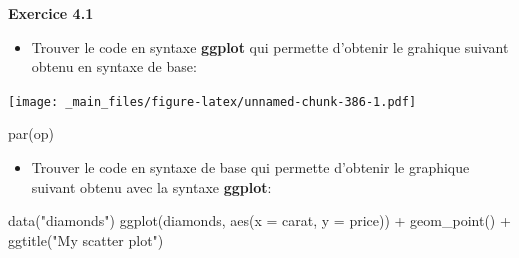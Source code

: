 \documentclass[
]{book}
\newenvironment{Shaded}{\begin{snugshade}}{\end{snugshade}}
\newcommand{\AttributeTok}[1]{\textcolor[rgb]{0.77,0.63,0.00}{#1}}
\newcommand{\DecValTok}[1]{\textcolor[rgb]{0.00,0.00,0.81}{#1}}
\newcommand{\FloatTok}[1]{\textcolor[rgb]{0.00,0.00,0.81}{#1}}
\newcommand{\FunctionTok}[1]{\textcolor[rgb]{0.00,0.00,0.00}{#1}}
\newcommand{\NormalTok}[1]{#1}
\newcommand{\OtherTok}[1]{\textcolor[rgb]{0.56,0.35,0.01}{#1}}
\newcommand{\SpecialCharTok}[1]{\textcolor[rgb]{0.00,0.00,0.00}{#1}}
\newcommand{\StringTok}[1]{\textcolor[rgb]{0.31,0.60,0.02}{#1}}
\providecommand{\tightlist}{%
  \setlength{\itemsep}{0pt}\setlength{\parskip}{0pt}}
\theoremstyle{definition}
\theoremstyle{definition}
\theoremstyle{definition}
\theoremstyle{definition}
\theoremstyle{remark}
\begin{document}
\textbf{Exercice 4.1}

\begin{itemize}
\tightlist
\item
  Trouver le code en syntaxe \textbf{ggplot} qui permette d'obtenir le grahique suivant obtenu en syntaxe de base:
\end{itemize}

\begin{Shaded}
\end{Shaded}

\texttt{[image: \_main\_files/figure-latex/unnamed-chunk-386-1.pdf]}

\begin{Shaded}
\begin{Highlighting}[]
\FunctionTok{par}\NormalTok{(op)}
\end{Highlighting}
\end{Shaded}

\begin{itemize}
\tightlist
\item
  Trouver le code en syntaxe de base qui permette d'obtenir le graphique suivant obtenu avec la syntaxe \textbf{ggplot}:
\end{itemize}

\begin{Shaded}
\begin{Highlighting}[]
\FunctionTok{data}\NormalTok{(}\StringTok{"diamonds"}\NormalTok{)}
\FunctionTok{ggplot}\NormalTok{(diamonds, }
       \FunctionTok{aes}\NormalTok{(}\AttributeTok{x =}\NormalTok{ carat,}
           \AttributeTok{y =}\NormalTok{ price)) }\SpecialCharTok{+} 
  \FunctionTok{geom\_point}\NormalTok{() }\SpecialCharTok{+} 
  \FunctionTok{ggtitle}\NormalTok{(}\StringTok{"My scatter plot"}\NormalTok{)}
\end{Highlighting}
\end{Shaded}
\end{document}
